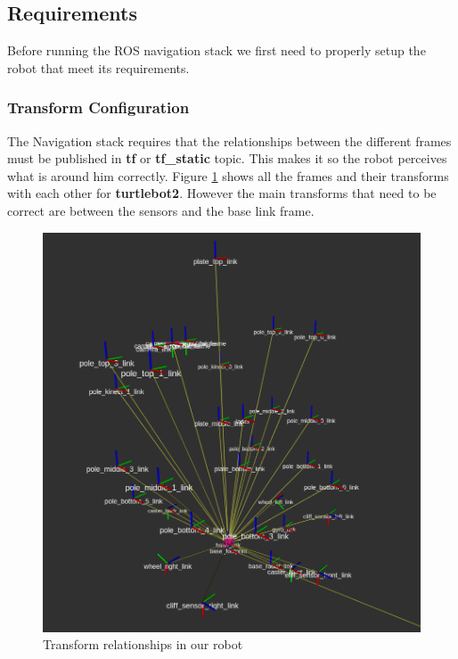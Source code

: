 \subsection{Requirements}
 Before running the \ac{ROS} navigation stack we first need to properly setup the robot that meet its requirements.
\subsubsection{Transform Configuration}
The Navigation stack requires that the relationships between the different frames must be published in \textbf{tf} or \textbf{tf\_static} topic. This makes it so the robot perceives what is around him correctly.
Figure \ref{fig:tf} shows all the frames and their transforms with each other for \textbf{turtlebot2}. However the main transforms that need to be correct are between the sensors and the base link frame.
\begin{figure}[!htb]
    \centering
    \includegraphics[scale=0.4]{imgs/chapter3/tf.png}
    \caption{Transform relationships in our robot}
    \label{fig:tf}
\end{figure}

